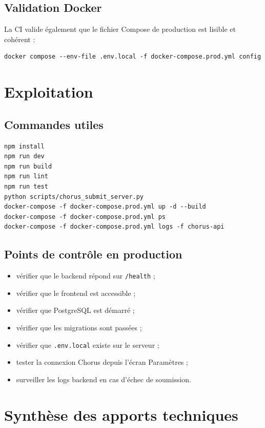 \documentclass[11pt,a4paper]{article}
\begin{document}
\subsection{Validation Docker}

La CI valide également que le fichier Compose de production est lisible et
cohérent :

\begin{lstlisting}
docker compose --env-file .env.local -f docker-compose.prod.yml config
\end{lstlisting}

\section{Exploitation}

\subsection{Commandes utiles}

\begin{lstlisting}
npm install
npm run dev
npm run build
npm run lint
npm run test
python scripts/chorus_submit_server.py
docker-compose -f docker-compose.prod.yml up -d --build
docker-compose -f docker-compose.prod.yml ps
docker-compose -f docker-compose.prod.yml logs -f chorus-api
\end{lstlisting}

\subsection{Points de contrôle en production}

\begin{itemize}
  \item vérifier que le backend répond sur \texttt{/health} ;
  \item vérifier que le frontend est accessible ;
  \item vérifier que PostgreSQL est démarré ;
  \item vérifier que les migrations sont passées ;
  \item vérifier que \texttt{.env.local} existe sur le serveur ;
  \item tester la connexion Chorus depuis l'écran Paramètres ;
  \item surveiller les logs backend en cas d'échec de soumission.
\end{itemize}

\section{Synthèse des apports techniques}
\end{document}
